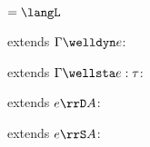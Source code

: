 \begin{flushleft}

 $= \langL$\\

\medskip
\begin{minipage}[t]{0.5\textwidth}
 extends $\Gamma \welldyn e$:
\begin{mathpar}

\end{mathpar}
\end{minipage}%
\begin{minipage}[t]{0.5\textwidth}
 extends $\Gamma \wellsta e : \tau$:
\begin{mathpar}

\end{mathpar}
\end{minipage}

\medskip
\begin{minipage}[t]{0.5\textwidth}
 extends $e \rrD A$:
\begin{mathpar}



\end{mathpar}
\end{minipage}%
\begin{minipage}[t]{0.5\textwidth}
 extends $e \rrS A$:
\begin{mathpar}


\end{mathpar}
\end{minipage}
\end{flushleft}
